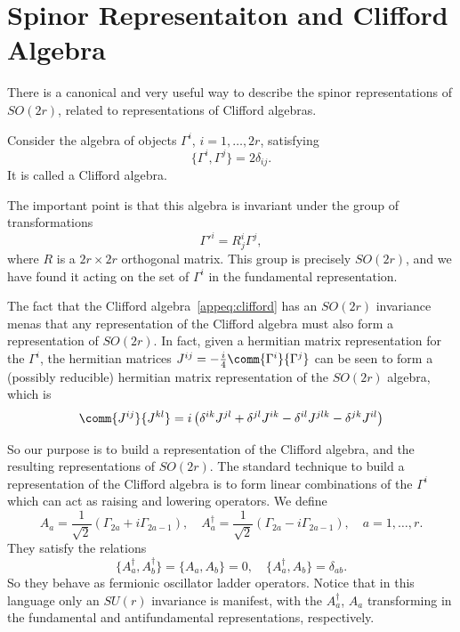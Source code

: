 \section{Spinor Representaiton and Clifford Algebra}
There is a canonical and very useful way to describe the spinor representations of $SO(2r)$, related to representations of Cliﬀord algebras.

Consider the algebra of objects $\Gamma^i$, $i = 1, \dots, 2r$, satisfying
\begin{equation}\label{appeq:clifford}
    \{\Gamma^i, \Gamma^j\} = 2 \delta_{ij}.
\end{equation}
It is called a Cliﬀord algebra.

The important point is that this algebra is invariant under the group of transformations
\begin{equation}
    \Gamma'^i = R^i_j \Gamma^j,
\end{equation}
where $R$ is a $2r\times2r$ orthogonal matrix. This group is precisely $SO(2r)$, and we have found it acting on the set of $\Gamma^i$ in the fundamental representation.

The fact that the Cliﬀord algebra~\eqref{appeq:clifford} has an $SO(2r)$ invariance menas that any representation of the Cliﬀord algebra must also form a representation of $SO(2r)$. In fact, given a hermitian matrix representation for the $\Gamma^i$, the hermitian matrices $J^{ij} = -\frac{i}{4}\comm{\Gamma^i}{\Gamma^j}$ can be seen to form a (possibly reducible) hermitian matrix representation of the $SO(2r)$ algebra, which is
\begin{equation}
    \comm{J^{ij}}{J^{kl}} = i \left( \delta^{ik} J^{jl} + \delta^{jl} J^{ik} - \delta^{il} J^{jlk} - \delta^{jk} J^{il} \right)
\end{equation}

So our purpose is to build a representation of the Cliﬀord algebra, and the resulting representations of $SO(2r)$. The standard technique to build a representation of the Cliﬀord algebra is to form linear combinations of the $\Gamma^i$ which can act as raising and lowering operators. We define
\begin{equation}
    A_a = \frac{1}{\sqrt{2}} (\Gamma_{2a}+i \Gamma_{2a-1}), \quad A^\dagger_a = \frac{1}{\sqrt{2}} (\Gamma_{2a}-i \Gamma_{2a-1}), \quad  a = 1, \dots, r .
\end{equation}
They satisfy the relations
\begin{equation}
    \{ A^\dagger_a, A^\dagger_b \} = \{ A_a, A_b \} = 0, \quad \{A^\dagger_a, A_b\} = \delta_{ab} .
\end{equation}
So they behave as fermionic oscillator ladder operators. Notice that in this language only an $SU(r)$ invariance is manifest, with the $A^\dagger_a$, $A_a$ transforming in the fundamental and antifundamental representations, respectively.

